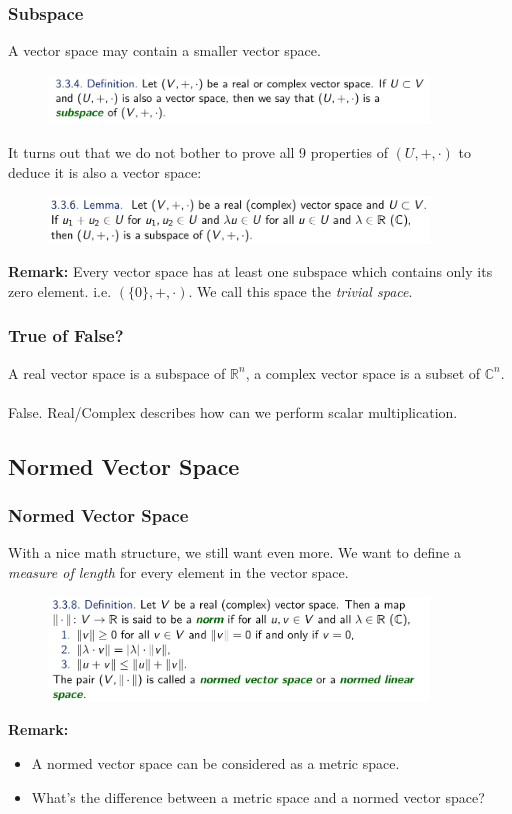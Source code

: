 \documentclass[10pt, t]{beamer}
\renewcommand{\emph}[1]{{\color{themecolor}\textsl{#1}}}
\newcommand{\R}{\mathbb{R}}
\newcommand{\nullspace}{~\\[15pt]}
\begin{document}
\begin{frame}
    \frametitle{Subspace}
    A vector space may contain a smaller vector space.
    \begin{figure}[H]
        \centering
        \includegraphics[width=0.9\textwidth]{2020-11-04-16-08-33.png}
    \end{figure}
    It turns out that we do not bother to prove all 9 properties of $(U,+,\cdot)$ to deduce it is also a vector space:
    \begin{figure}[H]
        \centering
        \includegraphics[width=0.9\textwidth]{2020-11-04-16-10-47.png}
    \end{figure}
    \textbf{Remark:} Every vector space has at least one subspace which contains only its zero element. i.e. $(\{0\},+,\cdot)$. We call this space the \emph{trivial space}.
\end{frame}

\begin{frame}
    \frametitle{True of False?}

     A real vector space is a subspace of $\R^n$, a complex vector space is a subset of $\mathbb{C}^n$.
    \nullspace
     \pause False. Real/Complex describes how can we perform scalar multiplication.
\end{frame}

\subsection{Normed Vector Space}
\begin{frame}
    \frametitle{Normed Vector Space}

    With a nice math structure, we still want even more. We want to define a \textit{measure of length} for every element in the vector space.
    \pause
    \begin{figure}[H]
        \centering
        \includegraphics[width=0.9\textwidth]{2020-11-04-16-17-22.png}
    \end{figure}
    \textbf{Remark:}
    \begin{itemize}
        \item A normed vector space can be considered as a metric space.
        \item What's the difference between a metric space and a normed vector space?
    \end{itemize}
\end{frame}
\end{document}
